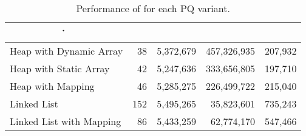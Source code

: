 
\begin{table}[t]
\centering
\begin{tabular}{|l|r|r|r|r|}

\multicolumn{1}{c}{\.} & 

\headrow{Max trades (w.c.)} & 
\headrow{Gas for max trades} & 
\headrow{Gas for 1000 trades} & 
\headrow{Gas for order (avg)} \\ \hline

Heap with Dynamic Array       & 38            & 5,372,679                   	& 457,326,935      & 207,932     \\ \hline
Heap with Static Array          	& 42            & 5,247,636                  	& 333,656,805         & 197,710         \\ \hline
Heap with Mapping 		& 46           	 & 5,285,275                     & 226,499,722    & 215,040           \\ \hline
Linked List                     	& 152            & 5,495,265                     & 35,823,601         & 735,243             \\ \hline
Linked List with Mapping      	& 86             & 5,433,259                     & 62,774,170        &  547,466              \\ \hline

\end{tabular}
\caption{Performance of \cm for each PQ variant.\label{tab:worst_case_matching}}

\end{table}




